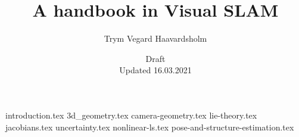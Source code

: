 \documentclass[12pt]{report}
\title{A handbook in Visual SLAM}
\author{Trym Vegard Haavardsholm}
\date{Draft\\Updated 16.03.2021}
\begin{document}
\maketitle

\tableofcontents
\listofexamples

{introduction.tex}
{3d_geometry.tex}
{camera-geometry.tex}
{lie-theory.tex}
{jacobians.tex}
{uncertainty.tex}
{nonlinear-ls.tex}
{pose-and-structure-estimation.tex}


\printbibliography[heading=bibintoc, title={Bibliography}]
\end{document}
